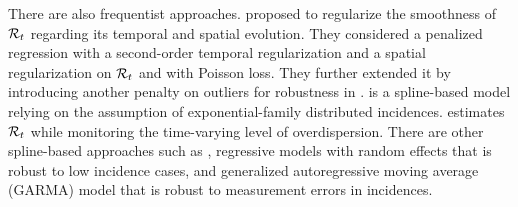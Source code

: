 There are also frequentist approaches. 
\cite{abry2020spatial} proposed to regularize the smoothness of $\mathcal{R}_t$ regarding its temporal and spatial evolution. They considered a penalized regression with a second-order temporal regularization and a spatial regularization on $\mathcal{R}_t$ and with Poisson loss. They further extended it by introducing another penalty on outliers for robustness in \cite{pascal2022nonsmooth}.  
%
\cite{pircal2023spline} is a spline-based model relying on the assumption of exponential-family distributed incidences. %
\cite{ho2023accounting} estimates $\mathcal{R}_t$ while monitoring the time-varying level of overdispersion. 
%
There are other spline-based approaches such as \cite{azmon2014estimation,gressani2021approximate,pircalabelu2023spline}, regressive models with random effects \citep{jin2023epimix} that is robust to low incidence cases, and generalized autoregressive moving average (GARMA) model \citep{hettinger2023estimating} that is robust to measurement errors in incidences. 
%


